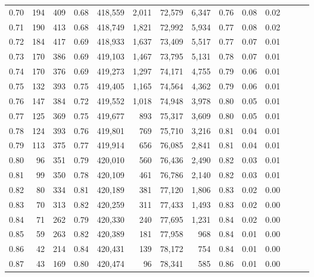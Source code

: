 \begin{tabular}{rrrrrrrrrrrrrr}
0.70 &     194 &    409 &  0.68 &  418,559 &    2,011 &  72,579 &   6,347 &  0.76 &  0.08 &      0.02 \\
0.71 &     190 &    413 &  0.68 &  418,749 &    1,821 &  72,992 &   5,934 &  0.77 &  0.08 &      0.02 \\
0.72 &     184 &    417 &  0.69 &  418,933 &    1,637 &  73,409 &   5,517 &  0.77 &  0.07 &      0.01 \\
0.73 &     170 &    386 &  0.69 &  419,103 &    1,467 &  73,795 &   5,131 &  0.78 &  0.07 &      0.01 \\
0.74 &     170 &    376 &  0.69 &  419,273 &    1,297 &  74,171 &   4,755 &  0.79 &  0.06 &      0.01 \\
0.75 &     132 &    393 &  0.75 &  419,405 &    1,165 &  74,564 &   4,362 &  0.79 &  0.06 &      0.01 \\
0.76 &     147 &    384 &  0.72 &  419,552 &    1,018 &  74,948 &   3,978 &  0.80 &  0.05 &      0.01 \\
0.77 &     125 &    369 &  0.75 &  419,677 &      893 &  75,317 &   3,609 &  0.80 &  0.05 &      0.01 \\
0.78 &     124 &    393 &  0.76 &  419,801 &      769 &  75,710 &   3,216 &  0.81 &  0.04 &      0.01 \\
0.79 &     113 &    375 &  0.77 &  419,914 &      656 &  76,085 &   2,841 &  0.81 &  0.04 &      0.01 \\
0.80 &      96 &    351 &  0.79 &  420,010 &      560 &  76,436 &   2,490 &  0.82 &  0.03 &      0.01 \\
0.81 &      99 &    350 &  0.78 &  420,109 &      461 &  76,786 &   2,140 &  0.82 &  0.03 &      0.01 \\
0.82 &      80 &    334 &  0.81 &  420,189 &      381 &  77,120 &   1,806 &  0.83 &  0.02 &      0.00 \\
0.83 &      70 &    313 &  0.82 &  420,259 &      311 &  77,433 &   1,493 &  0.83 &  0.02 &      0.00 \\
0.84 &      71 &    262 &  0.79 &  420,330 &      240 &  77,695 &   1,231 &  0.84 &  0.02 &      0.00 \\
0.85 &      59 &    263 &  0.82 &  420,389 &      181 &  77,958 &     968 &  0.84 &  0.01 &      0.00 \\
0.86 &      42 &    214 &  0.84 &  420,431 &      139 &  78,172 &     754 &  0.84 &  0.01 &      0.00 \\
0.87 &      43 &    169 &  0.80 &  420,474 &       96 &  78,341 &     585 &  0.86 &  0.01 &      0.00 \\

\end{tabular}
